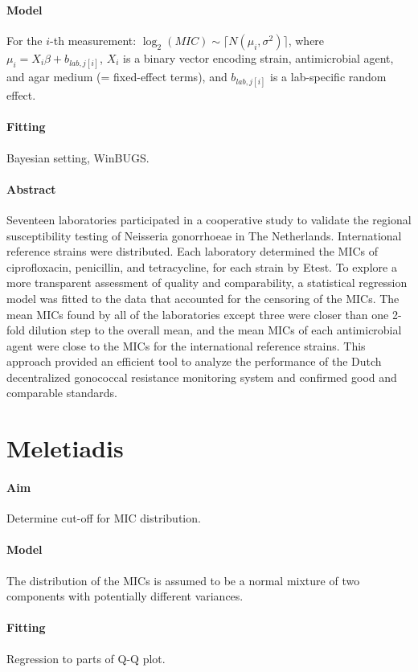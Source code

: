 \documentclass[a4paper]{article}
\begin{document}
\paragraph{Model} For the $i$-th measurement: $\log_2(MIC)\sim\lceil N(\mu_i,\sigma^2)\rceil$, where $\mu_i=X_i\beta+b_{lab,j[i]}$, $X_i$ is a binary vector encoding strain, antimicrobial agent, and agar medium (= fixed-effect terms), and $b_{lab,j[i]}$ is a lab-specific random effect.
\paragraph{Fitting} Bayesian setting, WinBUGS.
\paragraph{Abstract} Seventeen laboratories participated in a cooperative study to validate the regional susceptibility testing of Neisseria gonorrhoeae in The Netherlands. International reference strains were distributed. Each laboratory determined the MICs of ciprofloxacin, penicillin, and tetracycline, for each strain by Etest. To explore a more transparent assessment of quality and comparability, a statistical regression model was fitted to the data that accounted for the censoring of the MICs. The mean MICs found by all of the laboratories except three were closer than one 2-fold dilution step to the overall mean, and the mean MICs of each antimicrobial agent were close to the MICs for the international reference strains. This approach provided an efficient tool to analyze the performance of the Dutch decentralized gonococcal resistance monitoring system and confirmed good and comparable standards.



\section{Meletiadis \cite{Meletiadis2012}}
\paragraph{Aim} Determine cut-off for MIC distribution.
\paragraph{Model} The distribution of the MICs is assumed to be a normal mixture of two components with potentially different variances.
\paragraph{Fitting} Regression to parts of Q-Q plot.
\end{document}
